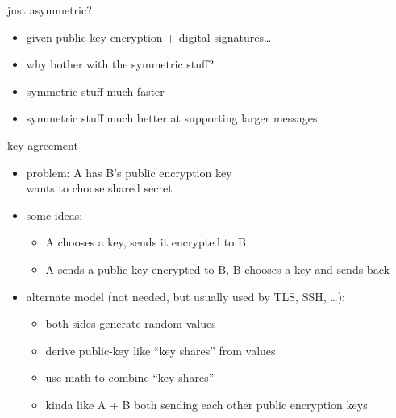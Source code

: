 \begin{frame}{just asymmetric?}
    \begin{itemize}
    \item given public-key encryption + digital signatures\ldots
    \item why bother with the symmetric stuff?
    \vspace{.5cm}
    \item symmetric stuff much faster
    \item symmetric stuff much better at supporting larger messages
    \end{itemize}
\end{frame}

\begin{frame}{key agreement}
    \begin{itemize}
    \item problem: A has B's public encryption key \\
        wants to choose shared secret 
    \vspace{.5cm}
    \item some ideas:
        \begin{itemize}
        \item A chooses a key, sends it encrypted to B
        \item A sends a public key encrypted to B, B chooses a key and sends back
        \end{itemize}
    \item<2-> alternate model (not needed, but usually used by TLS, SSH, \ldots):
        \begin{itemize}
        \item both sides generate random values
        \item derive public-key like ``key shares'' from values
        \item use math to combine ``key shares''
        \item kinda like A + B both sending each other public encryption keys
        \end{itemize}
    \end{itemize}
\end{frame}

